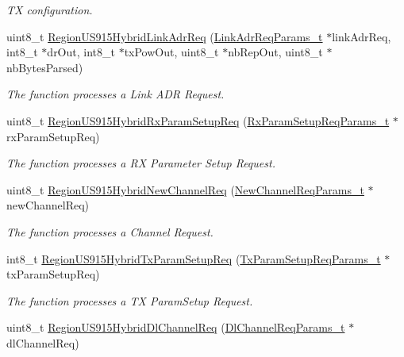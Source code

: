 \begin{DoxyCompactItemize}
\begin{DoxyCompactList}\small\item\em TX configuration. \end{DoxyCompactList}\item 
uint8\+\_\+t \mbox{\hyperlink{group___r_e_g_i_o_n_u_s915_h_y_b_gade4dc50b11235e0a6675b0d22240dea2}{Region\+U\+S915\+Hybrid\+Link\+Adr\+Req}} (\mbox{\hyperlink{group___r_e_g_i_o_n_gad4af503e8d4de1846129e26a799a1e8e}{Link\+Adr\+Req\+Params\+\_\+t}} $\ast$link\+Adr\+Req, int8\+\_\+t $\ast$dr\+Out, int8\+\_\+t $\ast$tx\+Pow\+Out, uint8\+\_\+t $\ast$nb\+Rep\+Out, uint8\+\_\+t $\ast$nb\+Bytes\+Parsed)
\begin{DoxyCompactList}\small\item\em The function processes a Link A\+DR Request. \end{DoxyCompactList}\item 
uint8\+\_\+t \mbox{\hyperlink{group___r_e_g_i_o_n_u_s915_h_y_b_gaaee00f3fbfae1f41b0eec05d8b564177}{Region\+U\+S915\+Hybrid\+Rx\+Param\+Setup\+Req}} (\mbox{\hyperlink{group___r_e_g_i_o_n_ga7165f282c670c728c36d534df2285157}{Rx\+Param\+Setup\+Req\+Params\+\_\+t}} $\ast$rx\+Param\+Setup\+Req)
\begin{DoxyCompactList}\small\item\em The function processes a RX Parameter Setup Request. \end{DoxyCompactList}\item 
uint8\+\_\+t \mbox{\hyperlink{group___r_e_g_i_o_n_u_s915_h_y_b_ga8555b0827350263310c34afbb060842e}{Region\+U\+S915\+Hybrid\+New\+Channel\+Req}} (\mbox{\hyperlink{group___r_e_g_i_o_n_gae2abcdb6dbb843c9faf5fd3009eca9d6}{New\+Channel\+Req\+Params\+\_\+t}} $\ast$new\+Channel\+Req)
\begin{DoxyCompactList}\small\item\em The function processes a Channel Request. \end{DoxyCompactList}\item 
int8\+\_\+t \mbox{\hyperlink{group___r_e_g_i_o_n_u_s915_h_y_b_gaea3f732a576b39e66791fb8e319b39a9}{Region\+U\+S915\+Hybrid\+Tx\+Param\+Setup\+Req}} (\mbox{\hyperlink{group___r_e_g_i_o_n_ga26836ef2996e70410e42ef471073f855}{Tx\+Param\+Setup\+Req\+Params\+\_\+t}} $\ast$tx\+Param\+Setup\+Req)
\begin{DoxyCompactList}\small\item\em The function processes a TX Param\+Setup Request. \end{DoxyCompactList}\item 
uint8\+\_\+t \mbox{\hyperlink{group___r_e_g_i_o_n_u_s915_h_y_b_ga0656307062a414233d72e9cf68e5763c}{Region\+U\+S915\+Hybrid\+Dl\+Channel\+Req}} (\mbox{\hyperlink{group___r_e_g_i_o_n_gae0d608ff1f8ea0a430e4f9a4c38ec7f3}{Dl\+Channel\+Req\+Params\+\_\+t}} $\ast$dl\+Channel\+Req)

\end{DoxyCompactItemize}
